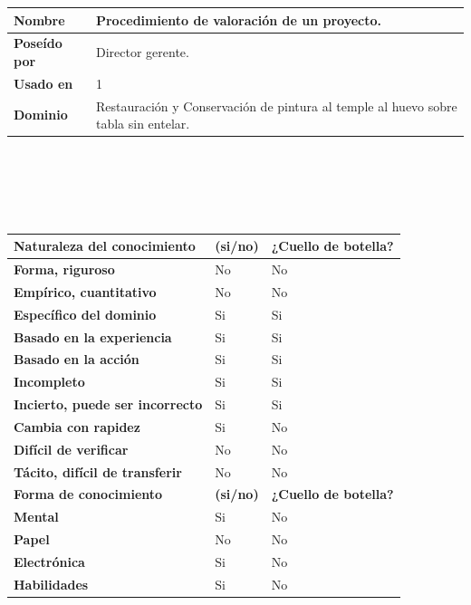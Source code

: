 \documentclass[a4paper,11pt]{article}
\begin{document}
			\begin{center}
				\begin{tabular}{| p{3cm} | p{8.85cm} |}
					\hline
					\textbf{Nombre} & Procedimiento de valoración de un proyecto.\\
					\hline
					\textbf{Poseído por} & Director gerente.\\
					\hline
					\textbf{Usado en} & 1\\
					\hline
					\textbf{Dominio} & Restauración y Conservación de pintura al temple al
					huevo sobre tabla sin entelar.\\
					\hline
				\end{tabular}
				\\
				\textbf{}
				\\
				\\
				\textbf{}
				\\
				\begin{tabular}{| p{6.3cm} | l | p{3.8cm} |}
					\hline
					\textbf{Naturaleza del conocimiento} & \textbf{(si/no)} & \textbf{¿Cuello
					de botella?}\\
					\hline
					\textbf{Forma, riguroso} & No & No\\
					\hline
					\textbf{Empírico, cuantitativo} & No & No\\
					\hline
					\textbf{Específico del dominio} & Si & Si\\
					\hline
					\textbf{Basado en la experiencia} & Si & Si\\
					\hline
					\textbf{Basado en la acción} & Si & Si\\
					\hline
					\textbf{Incompleto} & Si & Si\\
					\hline
					\textbf{Incierto, puede ser incorrecto} & Si & Si\\
					\hline
					\textbf{Cambia con rapidez} & Si & No\\
					\hline
					\textbf{Difícil de verificar} & No & No\\
					\hline
					\textbf{Tácito, difícil de transferir} & No & No\\
					\hline
					\textbf{Forma de conocimiento} & \textbf{(si/no)} & \textbf{¿Cuello
					de botella?}\\
					\hline
					\textbf{Mental} & Si & No\\
					\hline
					\textbf{Papel} & No & No\\
					\hline
					\textbf{Electrónica} & Si & No\\
					\hline
					\textbf{Habilidades} & Si & No\\

\end{tabular}
\end{center}
\end{document}
